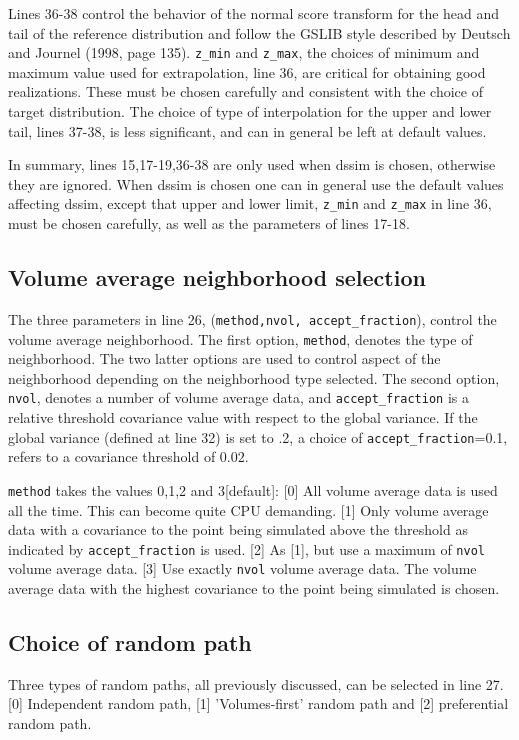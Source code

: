 \documentclass[12t]{article}
\begin{document}
Lines 36-38 control the behavior of the normal score transform for the
head and tail of the reference distribution and follow the GSLIB style described by Deutsch and Journel (1998, page 135).
\texttt{z\_min} and \texttt{z\_max}, the choices of minimum and
maximum value used for extrapolation, line 36, are critical for obtaining good
realizations. These must be chosen carefully and consistent with the choice of
target distribution.
The choice of type of interpolation for the upper and lower tail, lines
37-38, is less significant, and can in general be left at default
values.

In summary, lines 15,17-19,36-38 are only used when dssim is chosen,
otherwise they are ignored. When dssim is chosen one can in general
use the default values affecting dssim, except that upper and lower
limit, \texttt{z\_min} and \texttt{z\_max} in line 36, must be chosen
carefully, as well as the parameters of lines 17-18. 

\subsection{Volume average neighborhood selection} 
The three parameters in line 26, (\texttt{method,nvol,
  accept\_fraction}), control the volume average neighborhood. 
The first option, \texttt{method}, denotes the type of
neighborhood. The two latter options are used to control aspect of the
neighborhood depending on the neighborhood type selected. 
The second option, \texttt{nvol}, denotes a number of volume average
data, and \texttt{accept\_fraction} is a relative threshold covariance
value with respect to the global variance. If the global variance
(defined at line 32) is set to .2, a choice of  
\texttt{accept\_fraction}=0.1, refers to a covariance threshold of $0.02$. 

\texttt{method} takes the values 0,1,2 and 3[default]:
[0] All volume average data is used all the time. This can become quite CPU demanding.
[1] Only volume average data with a covariance to the point being
simulated above the threshold as indicated by
\texttt{accept\_fraction} is used. 
[2] As [1], but use a maximum of \texttt{nvol} volume average data.
[3] Use exactly \texttt{nvol} volume average data. The volume average data with the highest covariance to the point being simulated is chosen.

\subsection{Choice of random path} 
Three types of random paths, all previously discussed, can be selected in line 27. [0] Independent random path, [1] 'Volumes-first' random path and [2] preferential random path. 
\end{document}
